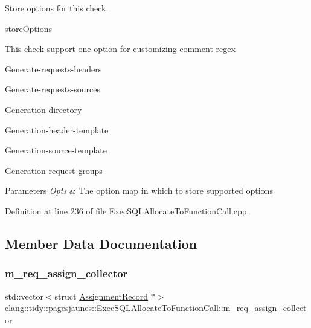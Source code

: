 Store options for this check. 

store\+Options

This check support one option for customizing comment regex
\begin{DoxyItemize}
\item Generate-\/requests-\/headers
\item Generate-\/requests-\/sources
\item Generation-\/directory
\item Generation-\/header-\/template
\item Generation-\/source-\/template
\item Generation-\/request-\/groups
\end{DoxyItemize}


\begin{DoxyParams}{Parameters}
{\em Opts} & The option map in which to store supported options \\
\hline
\end{DoxyParams}


Definition at line 236 of file Exec\+S\+Q\+L\+Allocate\+To\+Function\+Call.\+cpp.



\subsection{Member Data Documentation}
\mbox{\label{classclang_1_1tidy_1_1pagesjaunes_1_1_exec_s_q_l_allocate_to_function_call_af762cc2c9d3906e66d6a73102fcafae7}} 
\subsubsection{\texorpdfstring{m\+\_\+req\+\_\+assign\+\_\+collector}{m\_req\_assign\_collector}}
{\footnotesize\ttfamily std\+::vector$<$struct \hyperlink{structclang_1_1tidy_1_1pagesjaunes_1_1_exec_s_q_l_allocate_to_function_call_1_1_assignment_record}{Assignment\+Record} $\ast$$>$ clang\+::tidy\+::pagesjaunes\+::\+Exec\+S\+Q\+L\+Allocate\+To\+Function\+Call\+::m\+\_\+req\+\_\+assign\+\_\+collector\hspace{0.3cm}{\ttfamily [protected]}}



